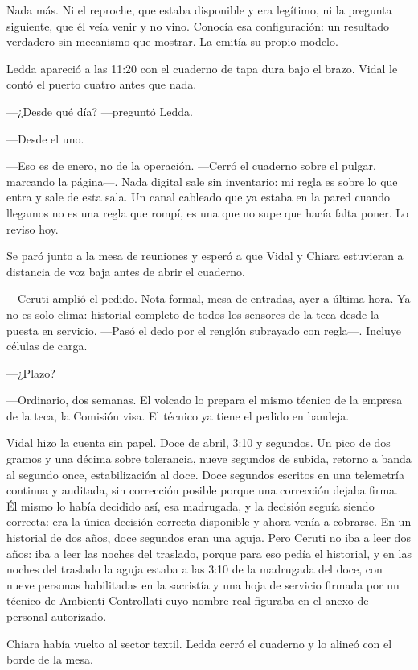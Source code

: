 Nada más. Ni el reproche, que estaba disponible y era legítimo, ni la pregunta siguiente, que él veía venir y no vino. Conocía esa configuración: un resultado verdadero sin mecanismo que mostrar. La emitía su propio modelo.

Ledda apareció a las 11:20 con el cuaderno de tapa dura bajo el brazo. Vidal le contó el puerto cuatro antes que nada.

---¿Desde qué día? ---preguntó Ledda.

---Desde el uno.

---Eso es de enero, no de la operación. ---Cerró el cuaderno sobre el pulgar, marcando la página---. Nada digital sale sin inventario: mi regla es sobre lo que entra y sale de esta sala. Un canal cableado que ya estaba en la pared cuando llegamos no es una regla que rompí, es una que no supe que hacía falta poner. Lo reviso hoy.

Se paró junto a la mesa de reuniones y esperó a que Vidal y Chiara estuvieran a distancia de voz baja antes de abrir el cuaderno.

---Ceruti amplió el pedido. Nota formal, mesa de entradas, ayer a última hora. Ya no es solo clima: historial completo de todos los sensores de la teca desde la puesta en servicio. ---Pasó el dedo por el renglón subrayado con regla---. Incluye células de carga.

---¿Plazo?

---Ordinario, dos semanas. El volcado lo prepara el mismo técnico de la empresa de la teca, la Comisión visa. El técnico ya tiene el pedido en bandeja.

Vidal hizo la cuenta sin papel. Doce de abril, 3:10 y segundos. Un pico de dos gramos y una décima sobre tolerancia, nueve segundos de subida, retorno a banda al segundo once, estabilización al doce. Doce segundos escritos en una telemetría continua y auditada, sin corrección posible porque una corrección dejaba firma. Él mismo lo había decidido así, esa madrugada, y la decisión seguía siendo correcta: era la única decisión correcta disponible y ahora venía a cobrarse. En un historial de dos años, doce segundos eran una aguja. Pero Ceruti no iba a leer dos años: iba a leer las noches del traslado, porque para eso pedía el historial, y en las noches del traslado la aguja estaba a las 3:10 de la madrugada del doce, con nueve personas habilitadas en la sacristía y una hoja de servicio firmada por un técnico de Ambienti Controllati cuyo nombre real figuraba en el anexo de personal autorizado.

Chiara había vuelto al sector textil. Ledda cerró el cuaderno y lo alineó con el borde de la mesa.

